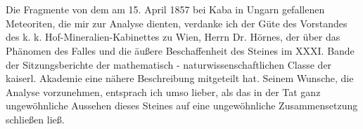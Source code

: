 \documentclass[a4paper, 11pt, oneside]{article}
\begin{document}
\setlength{\parskip}{1mm plus1mm minus1mm}
\clearpage
\tableofcontents
\clearpage
\LARGE
\pagestyle{fancy}
\fancyhf{}
\cfoot{\frakfamily{\thepage}}
\section{}
\paragraph{}
Die Fragmente von dem am 15. April 1857 bei Kaba in Ungarn gefallenen Meteoriten, die mir zur Analyse dienten, verdanke ich der Güte des Vorstandes des k. k. Hof-Mineralien-Kabinettes zu Wien, Herrn Dr. Hörnes, der über das Phänomen des Falles und die äußere Beschaffenheit des Steines im XXXI. Bande der Sitzungsberichte der mathematisch - naturwissenschaftlichen Classe der kaiserl. Akademie eine nähere Beschreibung mitgeteilt hat. Seinem Wunsche, die Analyse vorzunehmen, entsprach ich umso lieber, als das in der Tat ganz ungewöhnliche Aussehen dieses Steines auf eine ungewöhnliche Zusammensetzung schließen ließ.
\end{document}

